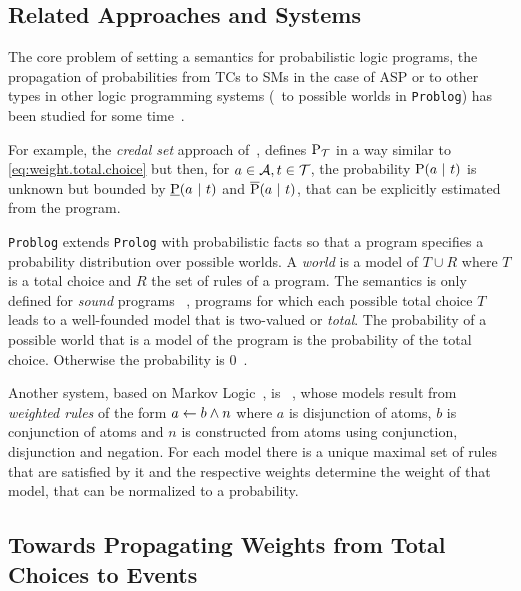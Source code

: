 \documentclass[x11names]{tlp}
\renewcommand{\cite}{\citep}
\begin{document}
\subsection*{Related Approaches and Systems}
\label{ssec:other.approaches}

The core problem of setting a semantics for probabilistic logic programs, the propagation of probabilities from \aclp{TC} to \aclp{SM} in the case of \ac{ASP} or to other types in other logic programming systems (\eg\ to possible worlds in \texttt{Problog}) has been studied for some time~\cite{kifer1992theory,sato1995statistical}.

For example, the \emph{credal set} approach of~\cite{cozman2020joy}, defines $\mathrm{P}_{{\mathcal{T}}}$ in a way similar to \cref{eq:weight.total.choice} but then, for $a \in {\mathcal{A}}, t \in {\mathcal{T}}$, the probability $\pr{a \given t}$ is unknown but bounded by $\underbar{\prfunc}\at{a \given t}$ and $\overline{\prfunc}\at{a \given t}$, that can be explicitly estimated from the program.

\texttt{Problog} \cite{fierens2015inference,verreet2022inference} extends \texttt{Prolog} with probabilistic facts so that a program specifies a probability distribution over possible worlds.
A \textit{world} is a model of $T \cup R$ where $T$ is a total choice and $R$ the set of rules of a program.
The semantics is only defined for \textit{sound} programs~\cite{riguzzi2013well} \ie, programs for which each possible total choice $T$ leads to a well-founded model that is two-valued or \textit{total}.
The probability of a possible world that is a model of the program is the probability of the total choice.
Otherwise the probability is $0$~\cite{riguzzi2013well,van1991well}.

Another system, based on Markov Logic~\cite{richardson2006markov}, is \lpmln~\cite{lee2016weighted,lee2017lpmln}, whose models result from \textit{weighted rules} of the form $a \leftarrow b \wedge n$ where $a$ is disjunction of atoms, $b$ is conjunction of atoms and $n$ is constructed from atoms using conjunction, disjunction and negation.
For each model there is a unique maximal set of rules that are satisfied by it and the respective weights determine the weight of that model, that can be normalized to a probability.

\subsection*{Towards Propagating Weights from Total Choices to Events}
\label{ssec:propagating.weights}
\end{document}

